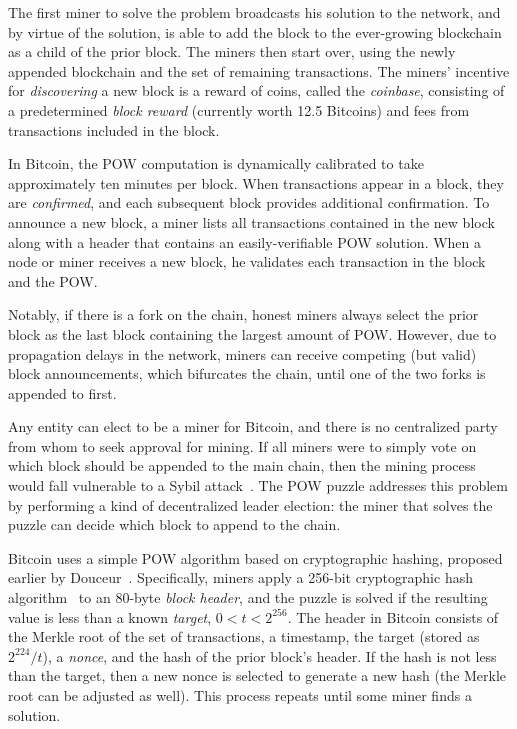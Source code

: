 \documentclass[10pt,sigconf]{acmart}
\newcommand{\para }[1]{\smallskip \noindent {\bf #1}}
\newcommand{\1}{{\em (i)}}
\newcommand{\2}{{\em (ii)}}
\newcommand{\3}{{\em (iii)}}
\newcommand{\4}{{\em (iv)}}
\newcommand{\5}{{\em (v)}}
\begin{document}
The first miner to solve the problem broadcasts his solution to the
network, and by virtue of the solution, is able to add the block to
the ever-growing blockchain as a child of the prior block. The miners
then start over, using the newly appended blockchain and the set of
remaining transactions. The miners' incentive for {\em discovering}
a new block is a reward of coins, called the {\em coinbase},
consisting of a predetermined {\em block reward} (currently worth 12.5 Bitcoins)
and fees from transactions included in the block.

In Bitcoin, the POW computation is dynamically calibrated to take
approximately ten minutes per block. When transactions appear in a
block, they are \emph{confirmed}, and each subsequent block
provides additional confirmation. To announce a new block, a miner
lists all transactions contained in the new block along with a header
that contains an easily-verifiable POW solution. When a node or
miner receives a new block, he validates each transaction in the block
and the POW.

Notably, if there is a fork on the chain, honest miners always select the prior block as the last block containing the largest amount of POW. However,
due to propagation delays in the network, 
miners can receive competing (but valid) block announcements, which
bifurcates the chain, until one of the two forks is appended to first.


\para{Block Headers.} 
Any entity can elect to be a miner for Bitcoin, and there is no
centralized party from whom to seek approval for mining. If all miners
were to simply vote on which block should be appended to the main chain, then the mining process would fall vulnerable to a Sybil
attack~\cite{Douceur:2002}. The POW puzzle addresses this
problem by performing a kind of decentralized leader election: the
miner that solves the puzzle can decide which block to append to the
chain.

\para{Proof-of-Work.} 
Bitcoin uses a simple POW algorithm based on cryptographic
hashing, proposed earlier by Douceur~\cite{Douceur:2002}.
Specifically, miners apply a 256-bit cryptographic hash algorithm~\cite{hashcash} to
an 80-byte {\em block header}, and the puzzle is solved if the
resulting value is less than a known {\em target}, $0<t<2^{256}$. The
header in Bitcoin consists of the Merkle root of the set of
transactions, a timestamp, the target (stored as $2^{224}/t$), a {\em
  nonce}, and the hash of the prior block's header. If the hash is not
less than the target, then a new nonce is selected to generate a new
hash (the Merkle root can be adjusted as well). This process repeats
until some miner finds a solution.
  
\end{document}
